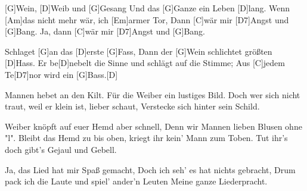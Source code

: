 

\begin{guitar}
	[G]Wein, [D]Weib und [G]Gesang
	Und das [G]Ganze ein Leben [D]lang.
	Wenn [Am]das nicht mehr wär, ich [Em]armer Tor,
	Dann [C]wär mir [D7]Angst und [G]Bang.
	Ja, dann [C]wär mir [D7]Angst und [G]Bang.
	
	Schlaget [G]an das [D]erste [G]Fass,
	Dann der [G]Wein schlichtet größten [D]Hass.
	Er be[D]nebelt die Sinne und schlägt auf die Stimme;
	Aus [C]jedem Te[D7]nor wird ein [G]Bass.[D]{}
	
	 
	Mannen hebet an den Kilt.
	Für die Weiber ein lustiges Bild.
	Doch wer sich nicht traut, weil er klein ist, lieber schaut,
	Verstecke sich hinter sein Schild.
	
	 
	Weiber knöpft auf euer Hemd aber schnell,
	Denn wir Mannen lieben Blusen ohne "l".
	Bleibt das Hemd zu bis oben, kriegt ihr kein' Mann zum Toben.
	Tut ihr's doch gibt's Gejaul und Gebell.
	
	 
	Ja, das Lied hat mir Spaß gemacht,
	Doch ich seh' es hat nichts gebracht,
	Drum pack ich die Laute und spiel' ander'n Leuten
	Meine ganze Liederpracht.
	
	 
\end{guitar}